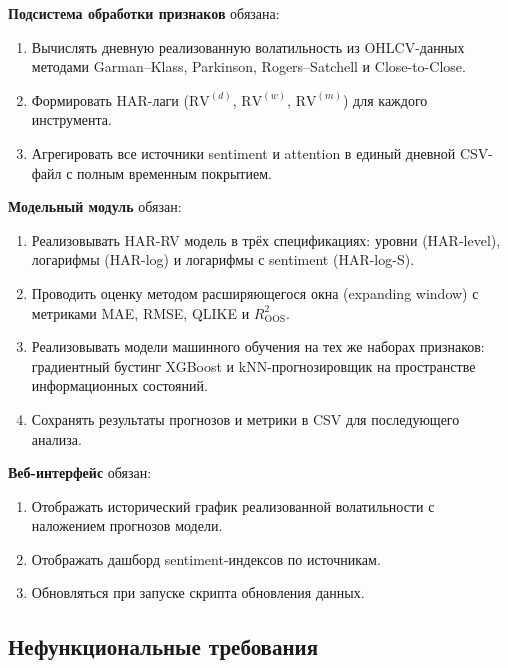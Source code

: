 \textbf{Подсистема обработки признаков} обязана:
\begin{enumerate}
    \item Вычислять дневную реализованную волатильность из OHLCV-данных
          методами Garman--Klass, Parkinson, Rogers--Satchell и Close-to-Close.
    \item Формировать HAR-лаги ($\mathrm{RV}^{(d)}$, $\mathrm{RV}^{(w)}$, $\mathrm{RV}^{(m)}$)
          для каждого инструмента.
    \item Агрегировать все источники sentiment и attention
          в единый дневной CSV-файл с полным временным покрытием.
\end{enumerate}

\textbf{Модельный модуль} обязан:
\begin{enumerate}
    \item Реализовывать HAR-RV модель в трёх спецификациях:
          уровни (HAR-level), логарифмы (HAR-log) и
          логарифмы с sentiment (HAR-log-S).
    \item Проводить оценку методом расширяющегося окна (expanding window)
          с метриками MAE, RMSE, QLIKE и $R^2_{\mathrm{OOS}}$.
    \item Реализовывать модели машинного обучения на тех же наборах
          признаков: градиентный бустинг XGBoost и kNN-прогнозировщик
          на пространстве информационных состояний.
    \item Сохранять результаты прогнозов и метрики в CSV для последующего анализа.
\end{enumerate}

\textbf{Веб-интерфейс} обязан:
\begin{enumerate}
    \item Отображать исторический график реализованной волатильности
          с наложением прогнозов модели.
    \item Отображать дашборд sentiment-индексов по источникам.
    \item Обновляться при запуске скрипта обновления данных.
\end{enumerate}

\subsection{Нефункциональные требования}

